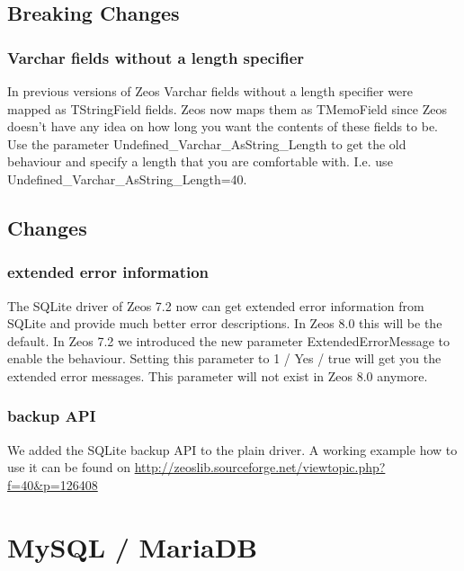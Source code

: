 \documentclass[a4paper,12pt,oneside]{book}
\begin{document}
\subsection{Breaking Changes}
\label{sec:Rev6_SQLite_BreakingChanges}

\subsubsection{Varchar fields without a length specifier}
\label{sec:Rev6_SQLite_BreakingChanges_VarcharWithoutLength}

In previous versions of Zeos Varchar fields without a length specifier were mapped as TStringField fields.
Zeos now maps them as TMemoField since Zeos doesn't have any idea on how long you want the contents of these fields to be.
Use the parameter Undefined\_Varchar\_AsString\_Length to get the old behaviour and specify a length that you are comfortable with.
I.e. use Undefined\_Varchar\_AsString\_Length=40.


\subsection{Changes}
\label{sec:Rev6_SQLite_Changes}

\subsubsection{extended error information}
\label{sec:Rev6_SQLite_Changes_ExtendedErrorInfo}
The SQLite driver of Zeos 7.2 now can get extended error information from SQLite and provide much better error descriptions.
In Zeos 8.0 this will be the default.
In Zeos 7.2 we introduced the new parameter ExtendedErrorMessage to enable the behaviour.
Setting this parameter to 1 / Yes / true will get you the extended error messages.
This parameter will not exist in Zeos 8.0 anymore.

\subsubsection{backup API}
\label{sec:Rev6_SQLite_Changes_BackupApi}

We added the SQLite backup API to the plain driver.
A working example how to use it can be found on \url{http://zeoslib.sourceforge.net/viewtopic.php?f=40&p=126408}

\section{MySQL / MariaDB}
\label{sec:Rev6_MysqlMariadb}
\end{document}
